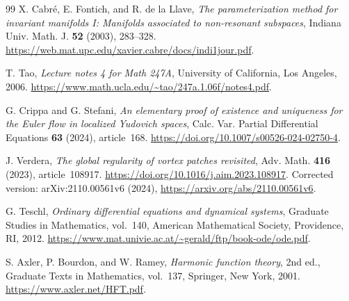 \documentclass[11pt]{amsart}
\theoremstyle{remark}
\numberwithin{equation}{section}
\begin{document}
\begin{thebibliography}{99}
X. Cabr\'e, E. Fontich, and R. de la Llave,
\emph{The parameterization method for invariant manifolds I:
Manifolds associated to non-resonant subspaces},
Indiana Univ. Math. J. \textbf{52} (2003), 283--328.
\url{https://web.mat.upc.edu/xavier.cabre/docs/indi1jour.pdf}.

T. Tao,
\emph{Lecture notes 4 for Math 247A},
University of California, Los Angeles, 2006.
\url{https://www.math.ucla.edu/~tao/247a.1.06f/notes4.pdf}.

G. Crippa and G. Stefani,
\emph{An elementary proof of existence and uniqueness for the
Euler flow in localized Yudovich spaces},
Calc. Var. Partial Differential Equations \textbf{63} (2024), article~168.
\url{https://doi.org/10.1007/s00526-024-02750-4}.

J. Verdera,
\emph{The global regularity of vortex patches revisited},
Adv. Math. \textbf{416} (2023), article~108917.
\url{https://doi.org/10.1016/j.aim.2023.108917}.
Corrected version: arXiv:2110.00561v6 (2024),
\url{https://arxiv.org/abs/2110.00561v6}.

G. Teschl,
\emph{Ordinary differential equations and dynamical systems},
Graduate Studies in Mathematics, vol.~140,
American Mathematical Society, Providence, RI, 2012.
\url{https://www.mat.univie.ac.at/~gerald/ftp/book-ode/ode.pdf}.

S. Axler, P. Bourdon, and W. Ramey,
\emph{Harmonic function theory}, 2nd ed.,
Graduate Texts in Mathematics, vol.~137,
Springer, New York, 2001.
\url{https://www.axler.net/HFT.pdf}.

\end{thebibliography}
\endgroup
\end{document}
